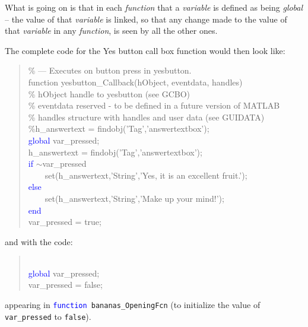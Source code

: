 \documentclass{tufte-book} %
\newenvironment{docspec}{\begin{quotation}\ttfamily\parskip0pt\parindent0pt\ignorespaces}{\end{quotation}}
\begin{document}
What is going on is that in each \textit{function} that a \textit{variable} is defined as being \textit{global} -- the value of that \textit{variable} is linked, so that any change made to the value of that \textit{variable} in any \textit{function}, is seen by all the other ones. 

The complete code for the \textsf{Yes} button call box function would then look like:

\begin{docspec}
\textcolor[rgb]{0,0.501961,0}{\% --- Executes on button press in yesbutton.}
\\function yesbutton\_Callback(hObject, eventdata, handles)
\textcolor[rgb]{0,0.501961,0}{\\\% hObject    handle to yesbutton (see GCBO)
\\\% eventdata  reserved - to be defined in a future version of MATLAB
\\\% handles    structure with handles and user data (see GUIDATA)
\\\%h\_answertext = findobj(\textcolor[rgb]{1,0,1}{'Tag'},\textcolor[rgb]{1,0,1}{'answertextbox'});}
\\\textcolor{blue}{global} \textcolor[rgb]{0,0.501961,1}{var\_pressed};
\\h\_answertext = findobj('Tag','answertextbox');
\\\textcolor{blue}{if} \(\sim\)\textcolor[rgb]{0,0.501961,1}{var\_pressed}
\\ \ \ \ \   set(h\_answertext,\textcolor[rgb]{1,0,1}{'String'},\textcolor[rgb]{1,0,1}{'Yes, it is an excellent fruit.'});
\\\textcolor{blue}{else}
\\ \ \ \ \   set(h\_answertext,\textcolor[rgb]{1,0,1}{'String'},\textcolor[rgb]{1,0,1}{'Make up your mind!'});
\\\textcolor{blue}{end}
\\\textcolor[rgb]{0,0.501961,1}{var\_pressed} = true;
\end{docspec}
and with the code:
\begin{docspec}
\\\textcolor{blue}{global} \textcolor[rgb]{0,0.501961,1}{var\_pressed};\\
\textcolor[rgb]{0,0.501961,1}{var\_pressed} = false;
\end{docspec}
appearing in \texttt{\textcolor{blue}{function} bananas\_OpeningFcn} (to initialize the value of \texttt{var\_pressed} to \texttt{false}).
\end{document}
